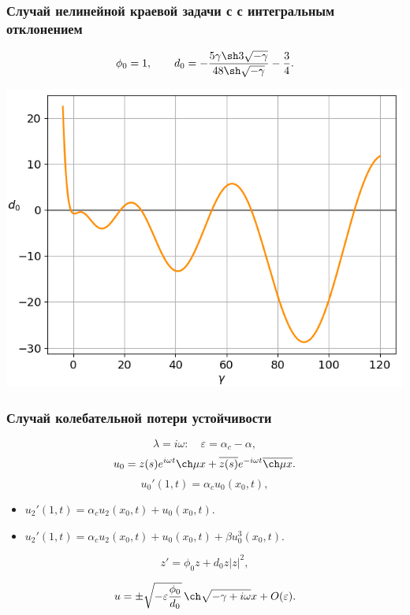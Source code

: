 \documentclass[fullscreen=true, unicode, bookmarks=false]{beamer}
\begin{document}
\begin{frame}
\frametitle {Случай нелинейной краевой задачи с с интегральным отклонением }

$$ \phi_0 = 1, \qquad d_0 = -\frac{5\gamma\sh3\sqrt{-\gamma}}{48\sh\sqrt{-\gamma}} - \frac{3}{4}. $$

\begin{center}
\includegraphics[scale=0.45]{integral_divergent_d0.png}
\end{center}

\end{frame}

\begin{frame}
\frametitle { Случай колебательной потери устойчивости }

$$ \lambda = i\omega: \quad \varepsilon = \alpha_c - \alpha, $$
\vfill
$$ u_0 = z(s) e^{i \omega t} \ch \mu x + \overline{z(s)} e^{-i \omega t} \overline{\ch \mu x}. $$
\vfill
$$ u_0'(1, t) = \alpha_c u_0(x_0, t), $$
\begin{itemize}
\item $ u_2'(1, t) = \alpha_c u_2(x_0, t) + u_0(x_0, t). $
\item $ u_2'(1, t) = \alpha_c u_2(x_0, t) + u_0(x_0, t) + \beta u_0^3(x_0, t). $
\end{itemize}

\begin{equation}\label{z_equation}
	z' = \phi_0 z + d_0 z |z|^2,
\end{equation}

$$ u = \pm \sqrt{ - \varepsilon \dfrac{\phi_0}{d_0} } \, \ch \sqrt{-\gamma + i\omega} x + O(\varepsilon). $$

\end{frame}
\end{document}
